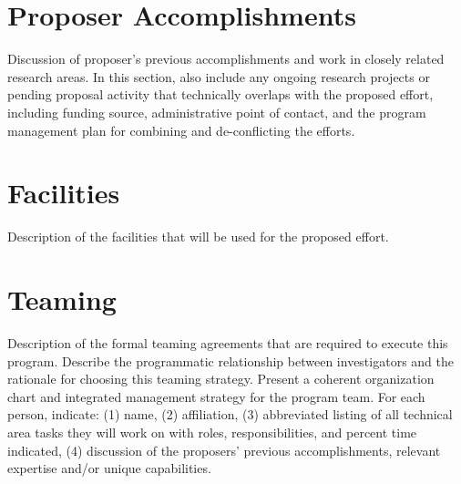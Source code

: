 \section{Proposer Accomplishments}
Discussion of proposer’s previous accomplishments and work in closely related research
areas. In this section, also include any ongoing research projects or pending proposal activity
that technically overlaps with the proposed effort, including funding source, administrative
point of contact, and the program management plan for combining and de-conflicting the
efforts.
\section{Facilities}
Description of the facilities that will be used for the proposed effort.
\section{Teaming}
Description of the formal teaming agreements that are required to execute this program.
Describe the programmatic relationship between investigators and the rationale for choosing
this teaming strategy. Present a coherent organization chart and integrated management
strategy for the program team. For each person, indicate: (1) name, (2) affiliation, (3)
abbreviated listing of all technical area tasks they will work on with roles, responsibilities,
and percent time indicated, (4) discussion of the proposers’ previous accomplishments,
relevant expertise and/or unique capabilities.
